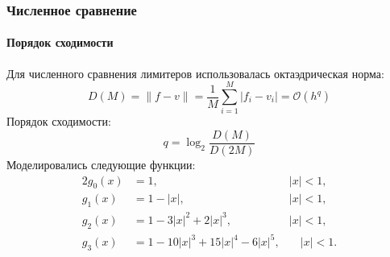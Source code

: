 \documentclass[ucs]{beamer}
\begin{document}
\begin{frame}
	\frametitle{Численное сравнение}
	\framesubtitle{Порядок сходимости}
	Для численного сравнения лимитеров использовалась октаэдрическая норма:
	\[ D(M) = \|f-v\| = \frac1{M}\sum_{i=1}^{M}|f_i-v_i| = \mathcal{O}(h^q) \]
	Порядок сходимости:
	\[ q = \log_2\frac{D(M)}{D(2M)} \]
	Моделировались следующие функции:
	\begin{alignat*}{2}
		g_0(x) &= 1,\quad &|x| < 1, \\
		g_1(x) &= 1-|x|,\quad &|x| < 1, \\
		g_2(x) &= 1-3|x|^2+2|x|^3,\quad &|x| < 1, \\
		g_3(x) &= 1-10|x|^3+15|x|^4-6|x|^5,&\quad |x| < 1. 
	\end{alignat*}

\end{frame}
\end{document}
